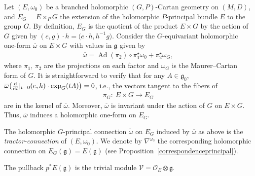 \documentclass[pdftex]{sigma}
\numberwithin{equation}{section}
\begin{document}
Let $(E,\omega_0)$ be a branched holomorphic $(G,P)$-Cartan geometry on $(M,D)$, and $E_G=E\times_{P} G$ the extension of the holomorphic $P$-principal bundle $E$ to the group $G$. By definition, $E_G$ is the quotient of the product $E\times G$ by the action of $G$ given by $(e,g)\cdot h = \big(e\cdot h,h^{-1}g\big)$. Consider the $G$-equivariant holomorphic one-form $\overline{\omega}$ on $E\times G$ with values in $\mathfrak{g}$ given by
 \begin{gather*}%
 \overline{\omega}= \operatorname{Ad}(\pi_2)\circ \pi_1^\star \omega_0 + \pi_2^\star \omega_G, \end{gather*}
 where $\pi_1$, $\pi_2$ are the projections on each factor and $\omega_G$ is the Maurer--Cartan form of $G$. It is straightforward to verify that for any $A\in \mathfrak{g}_0$, $\overline{\omega}\big(\frac{\rm d}{{\rm d}t}\vert_{t=0}(e,h)\cdot \exp_G(tA)\big) =0$, i.e., the vectors tangent to the fibers of
 \begin{gather*}%
 \pi_G\colon\ E\times G \longrightarrow E_G
 \end{gather*}
 are in the kernel of $\overline{\omega}$. Moreover, $\overline{\omega}$ is invariant under the action of $G$ on $E\times G$. Thus, $\overline{\omega}$ induces a holomorphic one-form on $E_G$.
\begin{Definition}\label{tractorconnection} The holomorphic $G$-principal connection $\tilde{\omega}$ on $E_G$ induced by $\overline{\omega}$ as above is the \textit{tractor-connection} of $(E,\omega_0)$. We denote by $\nabla^{\omega_0}$ the corresponding holomorphic connection on $E_G(\mathfrak{g})=E(\mathfrak{g})$ (see Proposition~\ref{correspondenceprincipal}). \end{Definition}

The pullback $p^* E(\mathfrak{g})$ is the trivial module $\mathcal{V}=\mathcal{O}_E\otimes \mathfrak{g}$.
\end{document}
